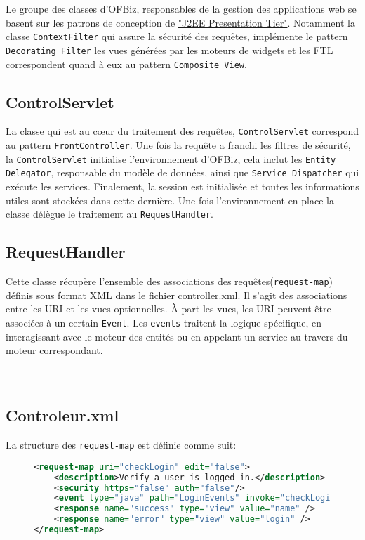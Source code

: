 Le groupe des classes d'OFBiz, responsables de la gestion des applications web se basent sur les patrons de conception de   \href{http://www2.sys-con.com/itsg/virtualcd/java/archives/0701/malks/index.html}{"J2EE Presentation Tier"}. Notamment la classe \verb|ContextFilter| qui assure la sécurité des requêtes, implémente le pattern \verb|Decorating Filter|  les vues générées par les moteurs de widgets et les FTL correspondent quand à eux au pattern \verb|Composite View|.
\subsection{ControlServlet}
La classe qui est au cœur du traitement des requêtes, \verb|ControlServlet| correspond au pattern \verb|FrontController|.
Une fois la requête a franchi les filtres de sécurité, la \verb|ControlServlet| initialise l'environnement d'OFBiz, cela inclut les \verb|Entity Delegator|, responsable du modèle de données, ainsi que  \verb|Service Dispatcher| qui exécute les services. Finalement, la session est initialisée et toutes les informations utiles sont stockées dans cette dernière. Une fois l'environnement en place la classe délègue le traitement au \verb|RequestHandler|.

\subsection{RequestHandler}
Cette classe récupère l'ensemble des associations des requêtes(\verb|request-map|) définis sous format XML dans le fichier controller.xml. Il s'agit des associations entre les URI et les vues optionnelles. À part les vues, les URI peuvent être associées à un certain \verb|Event|. Les \verb|events| traitent la logique spécifique, en interagissant avec le moteur des entités ou en appelant un service au travers du moteur correspondant. 
\\
\\
\\
\subsection{Controleur.xml}
La structure des \verb|request-map| est définie comme suit:
\begin{figure}[h!]
	\begin{lstlisting}[language=XML,frame=leftline]
<request-map uri="checkLogin" edit="false">
    <description>Verify a user is logged in.</description>
    <security https="false" auth="false"/>
    <event type="java" path="LoginEvents" invoke="checkLogin"/>
    <response name="success" type="view" value="name" />
    <response name="error" type="view" value="login" />
</request-map>
	\end{lstlisting}
\end{figure}\\
\\
